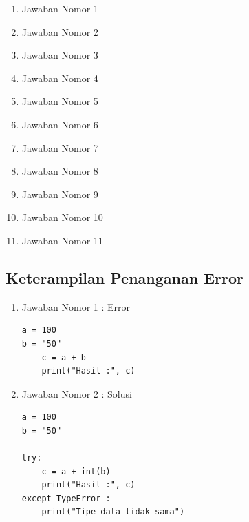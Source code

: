 \begin{enumerate}
\item Jawaban Nomor 1


\item Jawaban Nomor 2


\item Jawaban Nomor 3


\item Jawaban Nomor 4


\item Jawaban Nomor 5


\item Jawaban Nomor 6


\item Jawaban Nomor 7


\item Jawaban Nomor 8


\item Jawaban Nomor 9


\item Jawaban Nomor 10


\item Jawaban Nomor 11

\end{enumerate}

\subsection{Keterampilan Penanganan Error}
\begin{enumerate}
\item Jawaban Nomor 1  : Error
\begin{verbatim}
a = 100
b = "50"
    c = a + b
    print("Hasil :", c)
\end{verbatim}

\item Jawaban Nomor 2 : Solusi
\begin{verbatim}
a = 100
b = "50"

try:
    c = a + int(b)
    print("Hasil :", c)
except TypeError :
    print("Tipe data tidak sama") 
\end{verbatim}

\end{enumerate}


